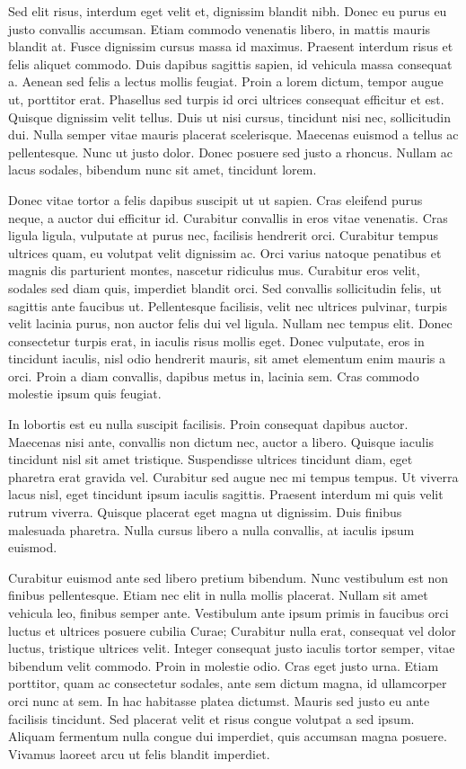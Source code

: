 Sed elit risus, interdum eget velit et, dignissim blandit nibh. Donec eu purus eu justo convallis accumsan. Etiam commodo venenatis libero, in mattis mauris blandit at. Fusce dignissim cursus massa id maximus. Praesent interdum risus et felis aliquet commodo. Duis dapibus sagittis sapien, id vehicula massa consequat a. Aenean sed felis a lectus mollis feugiat. Proin a lorem dictum, tempor augue ut, porttitor erat. Phasellus sed turpis id orci ultrices consequat efficitur et est. Quisque dignissim velit tellus. Duis ut nisi cursus, tincidunt nisi nec, sollicitudin dui. Nulla semper vitae mauris placerat scelerisque. Maecenas euismod a tellus ac pellentesque. Nunc ut justo dolor. Donec posuere sed justo a rhoncus. Nullam ac lacus sodales, bibendum nunc sit amet, tincidunt lorem.

Donec vitae tortor a felis dapibus suscipit ut ut sapien. Cras eleifend purus neque, a auctor dui efficitur id. Curabitur convallis in eros vitae venenatis. Cras ligula ligula, vulputate at purus nec, facilisis hendrerit orci. Curabitur tempus ultrices quam, eu volutpat velit dignissim ac. Orci varius natoque penatibus et magnis dis parturient montes, nascetur ridiculus mus. Curabitur eros velit, sodales sed diam quis, imperdiet blandit orci. Sed convallis sollicitudin felis, ut sagittis ante faucibus ut. Pellentesque facilisis, velit nec ultrices pulvinar, turpis velit lacinia purus, non auctor felis dui vel ligula. Nullam nec tempus elit. Donec consectetur turpis erat, in iaculis risus mollis eget. Donec vulputate, eros in tincidunt iaculis, nisl odio hendrerit mauris, sit amet elementum enim mauris a orci. Proin a diam convallis, dapibus metus in, lacinia sem. Cras commodo molestie ipsum quis feugiat.

In lobortis est eu nulla suscipit facilisis. Proin consequat dapibus auctor. Maecenas nisi ante, convallis non dictum nec, auctor a libero. Quisque iaculis tincidunt nisl sit amet tristique. Suspendisse ultrices tincidunt diam, eget pharetra erat gravida vel. Curabitur sed augue nec mi tempus tempus. Ut viverra lacus nisl, eget tincidunt ipsum iaculis sagittis. Praesent interdum mi quis velit rutrum viverra. Quisque placerat eget magna ut dignissim. Duis finibus malesuada pharetra. Nulla cursus libero a nulla convallis, at iaculis ipsum euismod.

Curabitur euismod ante sed libero pretium bibendum. Nunc vestibulum est non finibus pellentesque. Etiam nec elit in nulla mollis placerat. Nullam sit amet vehicula leo, finibus semper ante. Vestibulum ante ipsum primis in faucibus orci luctus et ultrices posuere cubilia Curae; Curabitur nulla erat, consequat vel dolor luctus, tristique ultrices velit. Integer consequat justo iaculis tortor semper, vitae bibendum velit commodo. Proin in molestie odio. Cras eget justo urna. Etiam porttitor, quam ac consectetur sodales, ante sem dictum magna, id ullamcorper orci nunc at sem. In hac habitasse platea dictumst. Mauris sed justo eu ante facilisis tincidunt. Sed placerat velit et risus congue volutpat a sed ipsum. Aliquam fermentum nulla congue dui imperdiet, quis accumsan magna posuere. Vivamus laoreet arcu ut felis blandit imperdiet.

